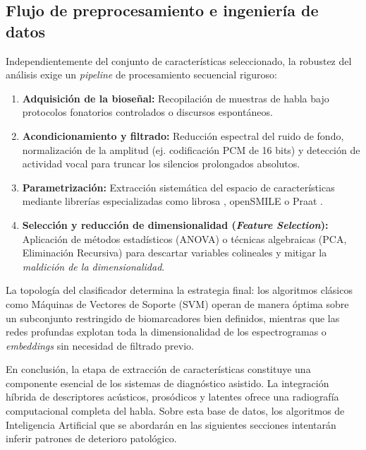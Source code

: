 \subsection{Flujo de preprocesamiento e ingeniería de datos}

Independientemente del conjunto de características seleccionado, la robustez del análisis exige un \textit{pipeline} de procesamiento secuencial riguroso:

\begin{enumerate}
    \item \textbf{Adquisición de la bioseñal:} Recopilación de muestras de habla bajo protocolos fonatorios controlados o discursos espontáneos.
    \item \textbf{Acondicionamiento y filtrado:} Reducción espectral del ruido de fondo, normalización de la amplitud (ej. codificación PCM de 16 bits) y detección de actividad vocal para truncar los silencios prolongados absolutos.
    \item \textbf{Parametrización:} Extracción sistemática del espacio de características mediante librerías especializadas como librosa \cite{mcfee2015}, openSMILE \cite{eyben2010} o Praat \cite{boersma2001}.
    \item \textbf{Selección y reducción de dimensionalidad (\textit{Feature Selection}):} Aplicación de métodos estadísticos (ANOVA) o técnicas algebraicas (PCA, Eliminación Recursiva) para descartar variables colineales y mitigar la \textit{maldición de la dimensionalidad}.
\end{enumerate}

La topología del clasificador determina la estrategia final: los algoritmos clásicos como Máquinas de Vectores de Soporte (SVM) operan de manera óptima sobre un subconjunto restringido de biomarcadores bien definidos, mientras que las redes profundas explotan toda la dimensionalidad de los espectrogramas o \textit{embeddings} sin necesidad de filtrado previo.

En conclusión, la etapa de extracción de características constituye una componente esencial de los sistemas de diagnóstico asistido. La integración híbrida de descriptores acústicos, prosódicos y latentes ofrece una radiografía computacional completa del habla. Sobre esta base de datos, los algoritmos de Inteligencia Artificial que se abordarán en las siguientes secciones intentarán inferir patrones de deterioro patológico.